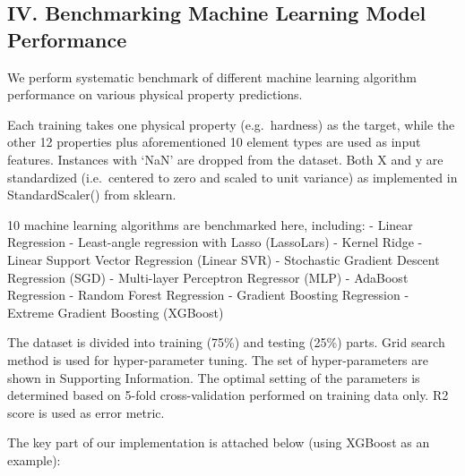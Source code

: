 \documentclass[11pt]{article}
\begin{document}
    

    \hypertarget{iv.-benchmarking-machine-learning-model-performance}{%
\subsection{IV. Benchmarking Machine Learning Model
Performance}\label{iv.-benchmarking-machine-learning-model-performance}}

    We perform systematic benchmark of different machine learning algorithm
performance on various physical property predictions.

Each training takes one physical property (e.g.~hardness) as the target,
while the other 12 properties plus aforementioned 10 element types are
used as input features. Instances with `NaN' are dropped from the
dataset. Both X and y are standardized (i.e.~centered to zero and scaled
to unit variance) as implemented in StandardScaler() from sklearn.

10 machine learning algorithms are benchmarked here, including: - Linear
Regression - Least-angle regression with Lasso (LassoLars) - Kernel
Ridge - Linear Support Vector Regression (Linear SVR) - Stochastic
Gradient Descent Regression (SGD) - Multi-layer Perceptron Regressor
(MLP) - AdaBoost Regression - Random Forest Regression - Gradient
Boosting Regression - Extreme Gradient Boosting (XGBoost)

The dataset is divided into training (75\%) and testing (25\%) parts.
Grid search method is used for hyper-parameter tuning. The set of
hyper-parameters are shown in Supporting Information. The optimal
setting of the parameters is determined based on 5-fold cross-validation
performed on training data only. R2 score is used as error metric.

The key part of our implementation is attached below (using XGBoost as
an example):
\end{document}
